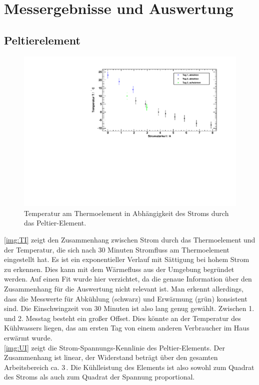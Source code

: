 \section{Messergebnisse und Auswertung}
\subsection{Peltierelement}

\begin{figure}[H]
\begin{center}
  \includegraphics[width=\textwidth]{../img/graph_T-I.pdf}
  \caption{Temperatur am Thermoelement
  in Abhängigkeit des Stroms durch das Peltier-Element.}
  \label{img:TI}
\end{center}
\end{figure}

\autoref{img:TI} zeigt den Zusammenhang zwischen Strom durch das Thermoelement
und der Temperatur, die sich nach 30 Minuten Stromfluss am Thermoelement eingestellt hat.
Es ist ein exponentieller Verlauf mit Sättigung bei hohem Strom zu erkennen.
Dies kann mit dem Wärmefluss aus der Umgebung begründet werden.
Auf einen Fit wurde hier verzichtet, da die genaue Information über den Zusammenhang
für die Auswertung nicht relevant ist.
Man erkennt allerdings, dass die Messwerte für Abkühlung (schwarz) und Erwärmung (grün) konsistent sind.
Die Einschwingzeit von 30 Minuten ist also lang genug gewählt.
Zwischen 1. und 2. Messtag besteht ein großer Offset.
Dies könnte an der Temperatur des Kühlwassers liegen,
das am ersten Tag von einem anderen Verbraucher im Haus erwärmt wurde.\\
\autoref{img:UI} zeigt die Strom-Spannungs-Kennlinie des Peltier-Elements.
Der Zusammenhang ist linear, der Widerstand beträgt über den gesamten Arbeitsbereich ca. 3\,\textOmega.
Die Kühlleistung des Elements ist also sowohl zum Quadrat des Stroms als auch zum Quadrat der Spannung proportional.



